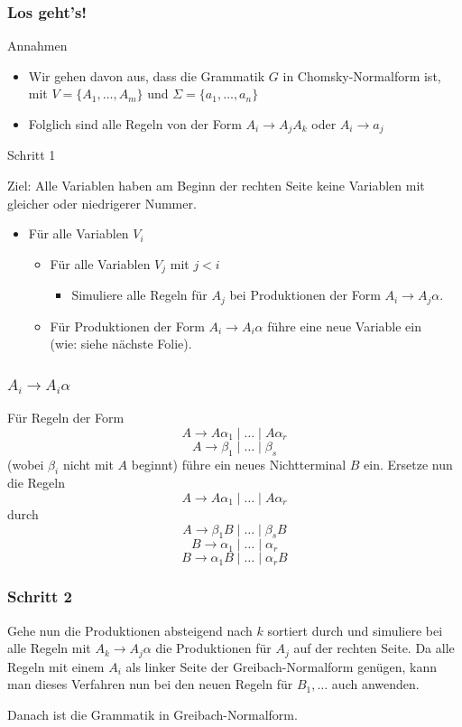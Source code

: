\begin{frame}
\frametitle{Los geht's!}
\begin{block}{Annahmen}
\begin{itemize}
 \item Wir gehen davon aus, dass die Grammatik $G$ in Chomsky-Normalform ist, mit $V = \{A_1, \ldots, A_m \}$ und $\Sigma = \{a_1, \ldots, a_n\}$
 \item Folglich sind alle Regeln von der Form $A_i \rightarrow A_jA_k$ oder $A_i \rightarrow a_j$
\end{itemize}
\end{block}
\begin{block}{Schritt 1}

Ziel: Alle Variablen haben am Beginn der rechten Seite keine Variablen mit gleicher oder niedrigerer Nummer.

\begin{itemize}
\item Für alle Variablen $V_i$
\begin{itemize}
\item Für alle Variablen $V_j$ mit $j<i$
\begin{itemize}
\item Simuliere alle Regeln für $A_j$ bei Produktionen der Form $A_i \rightarrow A_j\alpha$.
\end{itemize}
\item Für Produktionen der Form $A_i \rightarrow A_i\alpha$ führe eine neue Variable ein \\ (wie: siehe nächste Folie).
\end{itemize}
\end{itemize}
\end{block}
\end{frame}

\begin{frame}
\frametitle{$A_i \rightarrow A_i\alpha$}
Für Regeln der Form 
$$A \rightarrow A\alpha_1 \mid \ldots \mid A\alpha_r$$
$$A \rightarrow \beta_1 \mid \ldots \mid \beta_s$$
(wobei $\beta_i$ nicht mit $A$ beginnt) führe ein neues Nichtterminal $B$ ein. Ersetze nun die Regeln
$$A \rightarrow A\alpha_1 \mid \ldots \mid A\alpha_r$$
durch
$$A \rightarrow \beta_1B \mid \ldots \mid \beta_sB$$
$$B \rightarrow \alpha_1 \mid \ldots \mid \alpha_r$$
$$B \rightarrow \alpha_1B \mid \ldots \mid \alpha_rB$$
\end{frame}

\begin{frame}
 \frametitle{Schritt 2}
Gehe nun die Produktionen absteigend nach $k$ sortiert durch und simuliere bei alle Regeln mit $A_k \rightarrow A_j\alpha$ die Produktionen für $A_j$ auf der rechten Seite. \micropause
Da alle Regeln mit einem $A_i$ als linker Seite der Greibach-Normalform genügen, kann man dieses Verfahren nun bei den neuen Regeln für $B_1,\ldots$ auch anwenden.  \micropause

Danach ist die Grammatik in Greibach-Normalform.
\end{frame}

